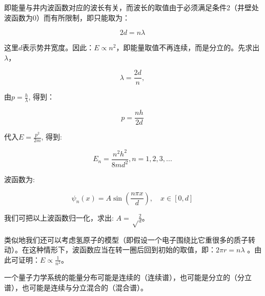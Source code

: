 即能量与井内波函数对应的波长有关，而波长的取值由于必须满足条件2（井壁处波函数为0）而有所限制，即只能取为：

\begin{equation}
2d = n \lambda~
\end{equation}

这里$d$表示势井宽度。因此：$E \propto n^2$，即能量取值不再连续，而是分立的。先求出$\lambda$，

\begin{equation}
\lambda = \frac{2d}{n},~
\end{equation}

由$p =\frac{h}{\lambda}$, 得到：

\begin{equation}
p = \frac{nh}{2d}~
\end{equation}

代入$E = \frac{p^2}{2m}$, 得到:

\begin{equation}
E_n = \frac{n^2 h^2}{8m d^2}, n=1,2,3,...~
\end{equation}

波函数为:

\begin{equation}
\psi_n(x) = A \sin \left( \frac{n \pi x}{d} \right), \quad x \in [0, d]~
\end{equation}


我们可把以上波函数归一化，求出: $A= \sqrt \frac{2}{d}$。

类似地我们还可以考虑氢原子的模型（即假设一个电子围绕比它重很多的质子转动）。在这种情形下，波函数应当在转一圈后回到初始的取值，即：$2 \pi r = n \lambda$ 。由此可证明：$E \propto \frac{1}{n^2}$。

一个量子力学系统的能量分布可能是连续的（连续谱），也可能是分立的（分立谱），也可能是连续与分立混合的（混合谱）。